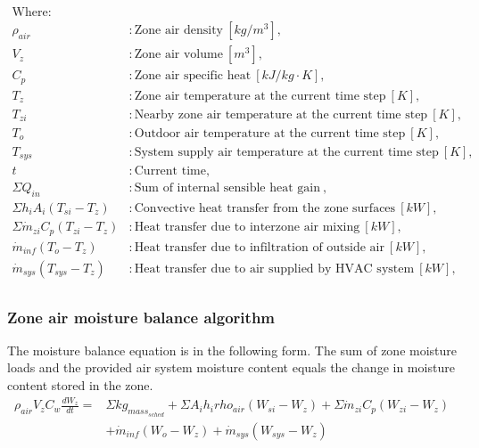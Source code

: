 \documentclass[11pt]{article}
\begin{document}
\begin{align*}
\text{Where: }\\
  \rho_{air} &: \text{Zone air density} ~ [kg/m^{3}], \\
  V_{z} &: \text{Zone air volume} ~ [m^{3}],\\
  C_{p} &: \text{Zone air specific heat} ~ [kJ/kg \cdot K],\\
  T_{z} &: \text{Zone air temperature at the current time step} ~[K],\\
  T_{zi} &: \text{Nearby zone air temperature at the current time step} ~[K],\\
  T_{o} &: \text{Outdoor air temperature at the current time step} ~[K],\\
  T_{sys} &: \text{System supply air temperature at the current time step} ~[K],\\
  t &: \text{Current time},\\
  \Sigma{Q_{in}} &: \text{Sum of internal sensible heat gain} ~ ,\\
  \Sigma{h_i A_i (T_{si}-T_z)} &: \text{Convective heat transfer from the zone surfaces} ~ [kW],\\
  \Sigma{\dot{m}_{zi}C_p(T_{zi}-T_z)} &: \text{Heat transfer due to interzone air mixing} ~ [kW],\\
  \dot{m}_{inf} (T_o - T_z)&: \text{Heat transfer due to infiltration of outside air} ~ [kW],\\
  \dot{m}_{sys} (T_{sys} - T_z)&: \text{Heat transfer due to air supplied by HVAC system} ~ [kW],\\
\end{align*}


\subsubsection{Zone air moisture balance algorithm}\label{Zone-air-moisture-balance-algorithm}
The moisture balance equation is in the following form. The sum of zone moisture loads and the provided air system moisture content equals the change in moisture content stored in the zone. 
\begin{equation}
\begin{aligned}
\rho_{air} V_{z} C_{w}\frac {dW_z} {dt} = &\Sigma{kg_{mass_{sched}}} + \Sigma{A_i h_i rho_{air} (W_{si} - W_z)} + \Sigma{\dot{m}_{zi} C_p (W_{zi}-W_z)} \\
& + \dot{m}_{inf} (W_o - W_z) + \dot{m}_{sys} (W_{sys} - W_z)
\end{aligned}
\end{equation}
\end{document}
